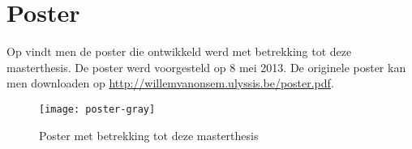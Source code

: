 \chapter{Poster}
\label{app:poster}
Op  vindt men de poster die ontwikkeld werd met betrekking tot deze masterthesis. De poster werd voorgesteld op 8 mei 2013. De originele poster kan men downloaden op \url{http://willemvanonsem.ulyssis.be/poster.pdf}.
\begin{figure}[hbt]
\centering
\texttt{[image: poster-gray]}
\caption{Poster met betrekking tot deze masterthesis}
\end{figure}

